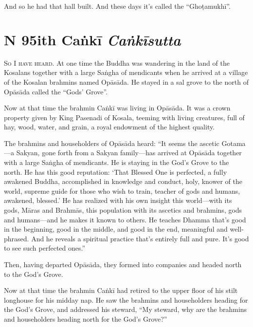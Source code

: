 \documentclass[12pt,openany]{book}%
\newcommand*{\suttatitleacronym}[1]{\smaller[2]{#1}\vspace*{.3em}}
\newcommand*{\suttatitletranslation}[1]{\linebreak{#1}}
\newcommand*{\suttatitleroot}[1]{\linebreak\smaller[2]\itshape{#1}}
\newcommand*{\tocacronym}[1]{\hspace*{-3.3em}{#1}\quad}
\newcommand*{\toctranslation}[1]{#1}
\newcommand*{\tocroot}[1]{(\textit{#1})}
\newcommand*{\scevam}[1]{\textsc{#1}}
\begin{document}
And so he had that hall built. And these days it’s called the “\textsanskrit{Ghoṭamukhī}”. 

%
\section*{{\suttatitleacronym MN 95}{\suttatitletranslation With Caṅkī }{\suttatitleroot Caṅkīsutta}}
\addcontentsline{toc}{section}{\tocacronym{MN 95} \toctranslation{With Caṅkī } \tocroot{Caṅkīsutta}}

\scevam{So I have heard. }At one time the Buddha was wandering in the land of the Kosalans together with a large \textsanskrit{Saṅgha} of mendicants when he arrived at a village of the Kosalan brahmins named \textsanskrit{Opāsāda}. He stayed in a sal grove to the north of \textsanskrit{Opāsāda} called the “Gods’ Grove”. 

Now at that time the brahmin \textsanskrit{Caṅkī} was living in \textsanskrit{Opāsāda}. It was a crown property given by King Pasenadi of Kosala, teeming with living creatures, full of hay, wood, water, and grain, a royal endowment of the highest quality. 

The brahmins and householders of \textsanskrit{Opāsāda} heard: “It seems the ascetic Gotama—a Sakyan, gone forth from a Sakyan family—has arrived at \textsanskrit{Opāsāda} together with a large \textsanskrit{Saṅgha} of mendicants. He is staying in the God’s Grove to the north. He has this good reputation: ‘That Blessed One is perfected, a fully awakened Buddha, accomplished in knowledge and conduct, holy, knower of the world, supreme guide for those who wish to train, teacher of gods and humans, awakened, blessed.’ He has realized with his own insight this world—with its gods, \textsanskrit{Māras} and \textsanskrit{Brahmās}, this population with its ascetics and brahmins, gods and humans—and he makes it known to others. He teaches Dhamma that’s good in the beginning, good in the middle, and good in the end, meaningful and well-phrased. And he reveals a spiritual practice that’s entirely full and pure. It’s good to see such perfected ones.” 

Then, having departed \textsanskrit{Opāsāda}, they formed into companies and headed north to the God’s Grove. 

Now at that time the brahmin \textsanskrit{Caṅkī} had retired to the upper floor of his stilt longhouse for his midday nap. He saw the brahmins and householders heading for the God’s Grove, and addressed his steward, “My steward, why are the brahmins and householders heading north for the God’s Grove?” 
\end{document}
